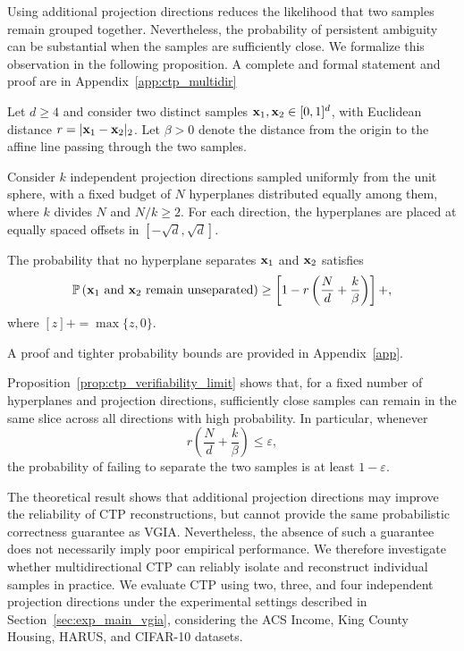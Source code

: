 Using additional projection directions reduces the likelihood that two samples remain grouped together. Nevertheless, the probability of persistent ambiguity can be substantial when the samples are sufficiently close. We formalize this observation in the following proposition. A complete and formal statement and proof are in Appendix~\ref{app:ctp_multidir}

\begin{proposition}
\label{prop:ctp_verifiability_limit}
Let $d\geq4$ and consider two distinct samples ${\mathbf{x}}_1,{\mathbf{x}}_2\in[0,1]^d$, with Euclidean distance $r=|{\mathbf{x}}_1-{\mathbf{x}}_2|_2$. Let $\beta>0$ denote the distance from the origin to the affine line passing through the two samples.

Consider $k$ independent projection directions sampled uniformly from the unit sphere, with a fixed budget of $N$ hyperplanes distributed equally among them, where $k$ divides $N$ and $N/k\geq2$. For each direction, the hyperplanes are placed at equally spaced offsets in $[-\sqrt d,\sqrt d]$.

The probability that no hyperplane separates ${\mathbf{x}}_1$ and ${\mathbf{x}}_2$ satisfies
\begin{equation}
\label{eq:ctp_unseparability}
\mathbb P\left(
\text{${\mathbf{x}}_1$ and ${\mathbf{x}}_2$ remain unseparated}
\right)
\geq
\left[
1-r\left(\frac{N}{d}+\frac{k}{\beta}\right)
\right]+,
\end{equation}
where $[z]+=\max\{z,0\}$.
\end{proposition}

A proof and tighter probability bounds are provided in Appendix~\ref{app}.

Proposition~\ref{prop:ctp_verifiability_limit} shows that, for a fixed number of hyperplanes and projection directions, sufficiently close samples can remain in the same slice across all directions with high probability. In particular, whenever
\begin{equation*}
r\left(\frac{N}{d}+\frac{k}{\beta}\right)\leq\varepsilon,
\end{equation*}
the probability of failing to separate the two samples is at least $1-\varepsilon$.

The theoretical result shows that additional projection directions may improve the reliability of CTP reconstructions, but cannot provide the same probabilistic correctness guarantee as VGIA. Nevertheless, the absence of such a guarantee does not necessarily imply poor empirical performance. We therefore investigate whether multidirectional CTP can reliably isolate and reconstruct individual samples in practice. We evaluate CTP using two, three, and four independent projection directions under the experimental settings described in Section~\ref{sec:exp_main_vgia}, considering the ACS Income, King County Housing, HARUS, and CIFAR-10 datasets.

